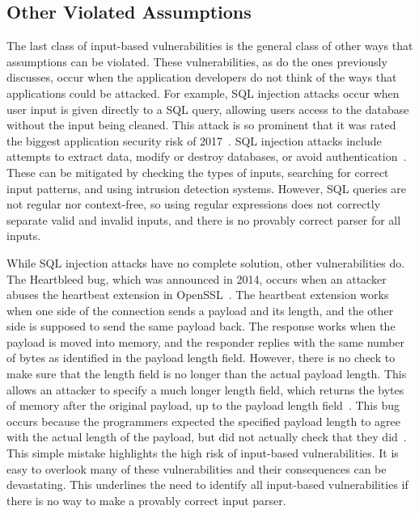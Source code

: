 \subsection{Other Violated Assumptions}
\label{sec:otherViolatedAssumptions}
The last class of input-based vulnerabilities is the general class of other ways that assumptions can be violated.  These vulnerabilities, as do the ones previously discusses, occur when the application developers do not think of the ways that applications could be attacked.  For example, SQL injection attacks occur when user input is given directly to a SQL query, allowing users access to the database without the input being cleaned.  This attack is so prominent that it was rated the biggest application security risk of 2017~\cite{owasp_2018}.  SQL injection attacks include attempts to extract data, modify or destroy databases, or avoid authentication~\cite{halfond2006classification}.  These can be mitigated by checking the types of inputs, searching for correct input patterns, and using intrusion detection systems.  However, SQL queries are not regular nor context-free, so using regular expressions does not correctly separate valid and invalid inputs, and there is no provably correct parser for all inputs.

While SQL injection attacks have no complete solution, other vulnerabilities do.  The Heartbleed bug, which was announced in 2014, occurs when an attacker abuses the heartbeat extension in OpenSSL~\cite{mehta_codenomicon_2014}.  The heartbeat extension works when one side of the connection sends a payload and its length, and the other side is supposed to send the same payload back.  The response works when the payload is moved into memory, and the responder replies with the same number of bytes as identified in the payload length field.  However, there is no check to make sure that the length field is no longer than the actual payload length.  This allows an attacker to specify a much longer length field, which returns the bytes of memory after the original payload, up to the payload length field~\cite{Durumeric_2014_MH_2663716_2663755}.  This bug occurs because the programmers expected the specified payload length to agree with the actual length of the payload, but did not actually check that they did~\cite{bratus2017parsing}.  This simple mistake highlights the high risk of input-based vulnerabilities.  It is easy to overlook many of these vulnerabilities and their consequences can be devastating.  This underlines the need to identify all input-based vulnerabilities if there is no way to make a provably correct input parser.

